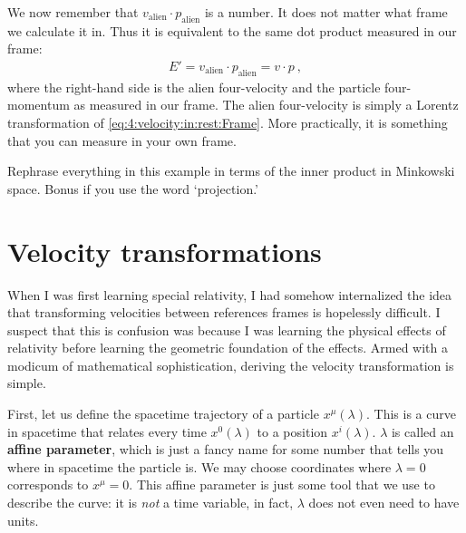 We now remember that $v_\text{alien}\cdot p_\text{alien}$ is a number. It does not matter what frame we calculate it in. Thus it is equivalent to the same dot product measured in our frame:
\begin{align}
E'=
    v_\text{alien}\cdot p_\text{alien} = v\cdot p \ ,
\end{align}
where the right-hand side is the alien four-velocity and the particle four-momentum as measured in our frame. The alien four-velocity is simply a Lorentz transformation of \eqref{eq:4:velocity:in:rest:Frame}. More practically, it is something that you can measure in your own frame. 


\begin{exercise}
Rephrase everything in this example in terms of the inner product in Minkowski space. Bonus if you use the word `projection.'
\end{exercise}




\section{Velocity transformations}

When I was first learning special relativity, I had somehow internalized the idea that transforming velocities between references frames is hopelessly difficult. I suspect that this is confusion was because I was learning the physical effects of relativity before learning the geometric foundation of the effects. Armed with a modicum of mathematical sophistication, deriving the velocity transformation is simple. 

First, let us define the spacetime trajectory of a particle $x^\mu(\lambda)$. This is a curve in spacetime that relates every time $x^0(\lambda)$ to a position $x^i(\lambda)$. $\lambda$ is called an \textbf{affine parameter}, which is just a fancy name for some number that tells you where in spacetime the particle is. We may choose coordinates where $\lambda=0$ corresponds to $x^\mu = 0$. This affine parameter is just some tool that we use to describe the curve: it is \emph{not} a time variable, in fact, $\lambda$ does not even need to have units. 

